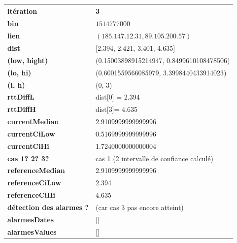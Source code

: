 \begin{table}[H]
	\centering
	
	\begin{tabularx}{\linewidth}{|l|X| }
		\hline
		\textbf{itération} & 3	\\ \hline
		\textbf{bin} & $1514777000$ \\ \hline
		\textbf{lien} & $(185.147.12.31, 89.105.200.57)$  \\ \hline
		\textbf{dist}& [2.394, 2.421, 3.401, 4.635]	\\ \hline
		\textbf{(low, hight)}& (0.15003898915214947, 0.8499610108478506) 	\\ \hline
		\textbf{(lo, hi)}&(0.6001559566085979, 3.3998440433914023)  \\ \hline
		\textbf{(l, h)} & (0, 3) 	\\ \hline
		\textbf{rttDiffL}& dist[0] = 2.394	\\ \hline
		\textbf{rttDiffH}& dist[3]= 4.635	\\ \hline
		\textbf{currentMedian}& 2.9109999999999996	\\ \hline
		\textbf{currentCiLow}& 0.5169999999999996 	\\ \hline
		\textbf{currentCiHi}& 1.7240000000000004	\\ \hline
		\textbf{cas 1? 2? 3?}& cas 1 (2 intervalle de confiance calculé)  \\ \hline
		\textbf{referenceMedian}& 2.9109999999999996	\\ \hline
		\textbf{referenceCiLow}& 2.394	\\ \hline
		\textbf{referenceCiHi}& 4.635	\\ \hline
		\textbf{détection des alarmes ?}& (car cas 3 pas  encore atteint)	\\ \hline
		\textbf{alarmesDates}& []	\\ \hline
		\textbf{alarmesValues}& []	\\ \hline
		
		
	\end{tabularx}
\end{table}



